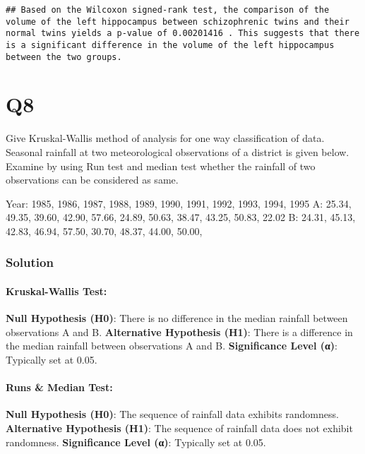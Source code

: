 \documentclass[
]{article}
\begin{document}
\begin{verbatim}
## Based on the Wilcoxon signed-rank test, the comparison of the volume of the left hippocampus between schizophrenic twins and their normal twins yields a p-value of 0.00201416 . This suggests that there is a significant difference in the volume of the left hippocampus between the two groups.
\end{verbatim}

\hypertarget{q8}{%
\section{Q8}\label{q8}}

Give Kruskal-Wallis method of analysis for one way classification of
data. Seasonal rainfall at two meteorological observations of a district
is given below. Examine by using Run test and median test whether the
rainfall of two observations can be considered as same.

Year: 1985, 1986, 1987, 1988, 1989, 1990, 1991, 1992, 1993, 1994, 1995
A: 25.34, 49.35, 39.60, 42.90, 57.66, 24.89, 50.63, 38.47, 43.25, 50.83,
22.02 B: 24.31, 45.13, 42.83, 46.94, 57.50, 30.70, 48.37, 44.00, 50.00,~

\hypertarget{solution-7}{%
\subsubsection{Solution}\label{solution-7}}

\hypertarget{kruskal-wallis-test-1}{%
\paragraph{Kruskal-Wallis Test:}\label{kruskal-wallis-test-1}}

\textbf{Null Hypothesis (H0)}: There is no difference in the median
rainfall between observations A and B. \textbf{Alternative Hypothesis
(H1)}: There is a difference in the median rainfall between observations
A and B. \textbf{Significance Level (α)}: Typically set at 0.05.

\hypertarget{runs-median-test}{%
\paragraph{Runs \& Median Test:}\label{runs-median-test}}

\textbf{Null Hypothesis (H0)}: The sequence of rainfall data exhibits
randomness. \textbf{Alternative Hypothesis (H1)}: The sequence of
rainfall data does not exhibit randomness. \textbf{Significance Level
(α)}: Typically set at 0.05.
\end{document}
